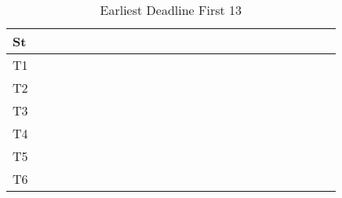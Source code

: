 \documentclass[xcolor=table]{beamer}
\begin{document}
\begin{frame}
\begin{table}
{\begin{tabular}{|l|l|l|l|l|l|l|l|l|l|l|l|l|l|l|l|l|l|l|l|l|l|l|l|l|}
\hline 
St &  \cellcolor{green} &  \cellcolor{green} &  \cellcolor{green} &  \cellcolor{green} &  \cellcolor{green} &  \cellcolor{green} &  \cellcolor{green} &  \cellcolor{green} &  \cellcolor{green} &  \cellcolor{green} &  \cellcolor{green} &  \cellcolor{green} &  \cellcolor{green} &  \cellcolor{green} &  \cellcolor{green} &  \cellcolor{green} &  \cellcolor{green} &  \cellcolor{green} &  \cellcolor{green} &  \cellcolor{green} &  \cellcolor{green} &  \cellcolor{green} &  \cellcolor{green} &  \cellcolor{green} \\ \hline 
T1 & & & & & & & & & & & & & & & & & & & & & & & & \\ \hline 
T2 & \cellcolor{purple} & \cellcolor{purple} & \cellcolor{purple} & \cellcolor{purple} & \cellcolor{purple} & \cellcolor{purple} & \cellcolor{purple} & \cellcolor{purple} & \cellcolor{purple} & \cellcolor{purple} & \cellcolor{purple} & \cellcolor{purple} & \cellcolor{purple} & \cellcolor{purple} & \cellcolor{purple} & \cellcolor{purple} & \cellcolor{purple} & \cellcolor{purple} & \cellcolor{purple} & \cellcolor{purple} & \cellcolor{purple} & \cellcolor{purple} & \cellcolor{purple} & \cellcolor{purple} \\ \hline 
T3 & & & & & & & & & & & & & & & & & & & & & & & & \\ \hline 
T4 & & & & & & & & & & & & & & & & & & & & & & & & \\ \hline 
T5 & & & & & & & & & & & & & & & & & & & & & & & & \\ \hline 
T6 & & & & & & & & & & & & & & & & & & & & & & & & \\ \hline 
\end{tabular} 
} 
\caption{ Earliest Deadline First 13 } 
\end{table} 
\begin{table} 
\centering 
{}
\end{table}
\end{frame}
\end{document}
